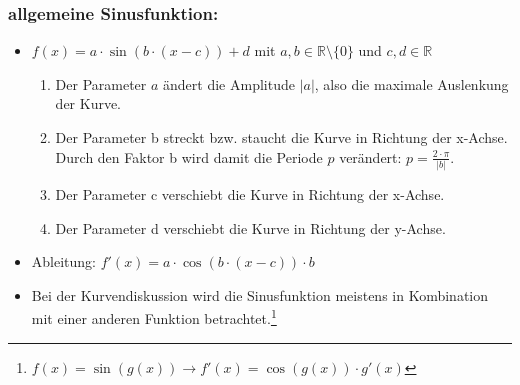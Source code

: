  \subsubsection{allgemeine Sinusfunktion:} 
 \begin{itemize}
 \item $ f(x)= a\cdot \sin{(b\cdot (x - c))}+d $ mit  $a, b\in \mathds{R}\setminus\{0\}$ und $c,d \in \mathds{R}$
 \begin{enumerate}
\item Der Parameter $a$ ändert die Amplitude $|a|$, also die maximale Auslenkung der Kurve.\\
\item Der Parameter b streckt bzw. staucht die Kurve in Richtung der x-Achse. Durch den Faktor b wird damit die Periode $p$ verändert: $p = \frac{2\cdot \pi}{|b|}$.\\
        \item Der Parameter c verschiebt die Kurve in Richtung der x-Achse.\\
        \item Der Parameter d verschiebt die Kurve in Richtung der y-Achse.
 \end{enumerate}
 \item Ableitung: $f'(x)=  a\cdot \cos{(b\cdot (x - c))}\cdot b $
 \item Bei der Kurvendiskussion wird die Sinusfunktion meistens in Kombination mit einer anderen Funktion betrachtet.\footnote{$f(x) = \sin{(g(x))}  \longrightarrow f'(x) = \cos{(g(x))}\cdot g'(x) $}
 \end{itemize}
